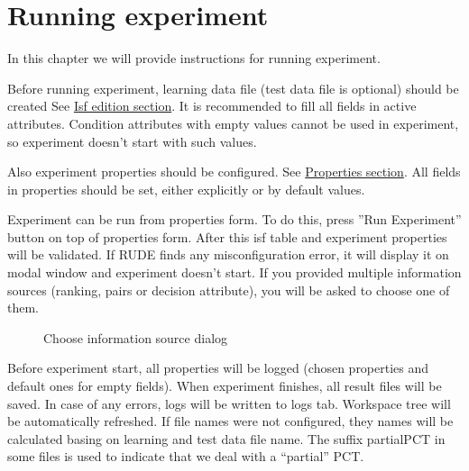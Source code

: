 \section{Running experiment}\label{section:experiment-running}

In this chapter we will provide instructions for running experiment.

Before running experiment, learning data file (test data file is optional) should be created See \hyperref[section:isf-table]{Isf edition section}. It is recommended to fill all fields in active attributes. Condition attributes with empty values cannot be used in experiment, so experiment doesn't start with such values.

Also experiment properties should be configured. See \hyperref[section:properties]{Properties section}. All fields in properties should be set, either explicitly or by default values.

Experiment can be run from properties form. To do this, press ''Run Experiment'' button on top of properties form. After this isf table and experiment properties will be validated. If RUDE finds any misconfiguration error, it will display it on modal window and experiment doesn't start. If you provided multiple information sources (ranking, pairs or decision attribute), you will be asked to choose one of them.

\begin{figure*}[!ht] 
	\centering
	\caption{Choose information source dialog}
\end{figure*}

Before experiment start, all properties will be logged (chosen properties and default ones for empty fields). When experiment finishes, all result files will be saved. In case of any errors, logs will be written to logs tab. Workspace tree will be automatically refreshed. If file names were not configured, they names will be calculated basing on learning and test data file name. The suffix partialPCT in some files is used to indicate that we deal with a “partial” PCT.

\vfill\newpage